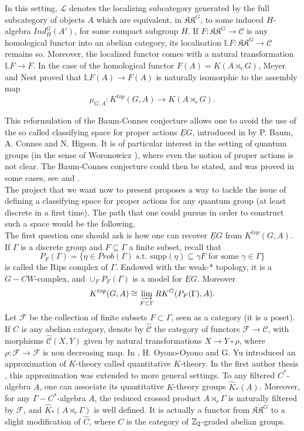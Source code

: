 In this setting, $\mathcal L$ denotes the localizing subcategory generated by the full subcategory of objects $A$ which are equivalent, in $\mathfrak{KK}^G$, to some induced $H$-algebra $Ind_H^G (A')$, for some compact subgroup $H$. If $F : \mathfrak{KK}^G \rightarrow \mathcal C$ is any homological functor into an abelian category, its localisation $\mathbb L F : \mathfrak{KK}^G \rightarrow \mathcal C$ remains so. Moreover, the localized functor comes with a natural transformation $\mathbb L F \rightarrow F $. In the case of the homological functor $F(A)= K(A\rtimes_r G)$, Meyer and Nest proved that $\mathbb L F(A) \rightarrow F(A) $ is naturally isomorphic to the assembly map \[\mu_{G,A} : K^{top}(G,A) \rightarrow K(A\rtimes_r G).\]

This reformulation of the Baum-Connes conjecture allows one to avoid the use of the so called classifying space for proper actions $\underline E G$, introduced in \cite{BaumConnesHigson} by P. Baum, A. Connes and N. Higson. It is of particular interest in the setting of quantum groups (in the sense of Woronowicz \cite{Wo}), where even the notion of proper actions is not clear. The Baum-Connes conjecture could then be stated, and was proved in some cases, see \cite{Voigt1} and \cite{Voigt2}. \\

The project that we want now to present proposes a way to tackle the issue of defining a classifying space for proper actions for any quantum group (at least discrete in a first time). The path that one could pursue in order to construct such a space would be the following.\\ 

The first question one should ask is how one can recover $\underline E G$ from $K^{top}(G,A)$. If $\Gamma$ is a discrete group and $F\subseteq \Gamma$ a finite subset, recall that 
\[P_F(\Gamma)= \{ \eta \in Prob(\Gamma) \text{ s.t. supp}(\eta ) \subseteq \gamma F \text{ for some } \gamma \in\Gamma \}\] 
is called the Rips complex of $\Gamma$. Endowed with the weak-$*$ topology, it is a $G-CW$-complex, and $\cup_F P_F(\Gamma)$ is a model for $\underline E G$. Moreover
\[K^{top}(G,A) \cong \varinjlim_{F\subset \Gamma} RK^G(P_F(\Gamma),A).\] 
Let $\mathcal F$ be the collection of finite subsets $F\subset \Gamma$, seen as a category (it is a poset). If $C$ is any abelian category, denote by $\hat{ \mathcal C}$ the category of functors $\mathcal F \rightarrow \mathcal C$, with morphisms $\hat{\mathcal C}(X,Y)$ given by natural transformations $X \rightarrow Y\circ \rho$, where $\rho :  \mathcal F \rightarrow \mathcal F$ is non decreasing map. In \cite{OY2}, H. Oyono-Oyono and G. Yu introduced an approximation of $K$-theory called quantitative $K$-theory. In the first author thesis \cite{DellAieraThesis}, this approximation was extended to more general settings. To any filtered $C^*$-algebra $A$, one can associate its quantitative $K$-theory groups $\hat K_*(A)$. Moreover, for any $\Gamma-C^*$-algebra $A$, the reduced crossed product $A\rtimes_r \Gamma$ is naturally filtered by $\mathcal F$, and $\hat K_* (A\rtimes_r \Gamma)$ is well defined. It is actually a functor from $\mathfrak{KK}^G$ to a slight modification of $\hat C$, where $C$ is the category of $\mathbb Z_2$-graded abelian groups.

